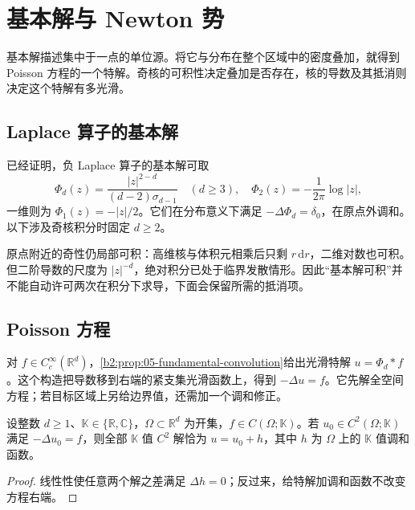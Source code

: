 \section{基本解与 Newton 势}
\label{b2:sec:1303}

基本解描述集中于一点的单位源。将它与分布在整个区域中的密度叠加，就得到 Poisson 方程的一个特解。奇核的可积性决定叠加是否存在，核的导数及其抵消则决定这个特解有多光滑。

\subsection{Laplace 算子的基本解}
\label{b2:subsec:130301}

已经证明，负 Laplace 算子的基本解可取
\[
 \Phi_d(z)=\dfrac{|z|^{2-d}}{(d-2)\sigma_{d-1}}\quad(d\geq3),
 \quad \Phi_2(z)=-\dfrac1{2\pi}\log|z|,
\]
一维则为 \(\Phi_1(z)=-|z|/2\)。它们在分布意义下满足 \(-\Delta\Phi_d=\delta_0\)，在原点外调和。以下涉及奇核积分时固定 \(d\geq2\)。

\ProseParagraphBreak

原点附近的奇性仍局部可积：高维核与体积元相乘后只剩 \(r\,\mathrm{d}r\)，二维对数也可积。但二阶导数的尺度为 \(|z|^{-d}\)，绝对积分已处于临界发散情形。因此“基本解可积”并不能自动许可两次在积分下求导，下面会保留所需的抵消项。

\subsection{Poisson 方程}
\label{b2:subsec:130302}

对 \(f\in C_c^\infty(\mathbb R^d)\)，\cref{b2:prop:05-fundamental-convolution}给出光滑特解 \(u=\Phi_d*f\)。这个构造把导数移到右端的紧支集光滑函数上，得到 \(-\Delta u=f\)。它先解全空间方程；若目标区域上另给边界值，还需加一个调和修正。

\begin{proposition}\label{b2:prop:13-poisson-affine-space}
设整数 \(d\geq1\)、\(\mathbb K\in\{\mathbb R,\mathbb C\}\)，\(\Omega\subset\mathbb R^d\) 为开集，\(f\in C(\Omega;\mathbb K)\)。若 \(u_0\in C^2(\Omega;\mathbb K)\) 满足 \(-\Delta u_0=f\)，则全部 \(\mathbb K\) 值 \(C^2\) 解恰为 \(u=u_0+h\)，其中 \(h\) 为 \(\Omega\) 上的 \(\mathbb K\) 值调和函数。
\end{proposition}
\begin{proof}
线性性使任意两个解之差满足 \(\Delta h=0\)；反过来，给特解加调和函数不改变方程右端。
\end{proof}

